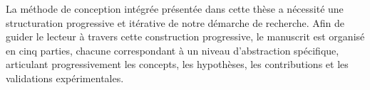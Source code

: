\documentclass[ twoside,openright,titlepage,numbers=noenddot,headinclude,%
                footinclude=true,cleardoublepage=empty,abstractoff, %
                BCOR=5mm,paper=a4,fontsize=11pt,%
                french,american,%
                ]{scrreprt}
\begin{document}
%

La méthode de conception intégrée présentée dans cette thèse a nécessité une structuration progressive et itérative de notre démarche de recherche. Afin de guider le lecteur à travers cette construction progressive, le manuscrit est organisé en cinq parties, chacune correspondant à un niveau d'abstraction spécifique, articulant progressivement les concepts, les hypothèses, les contributions et les validations expérimentales.
\end{document}
